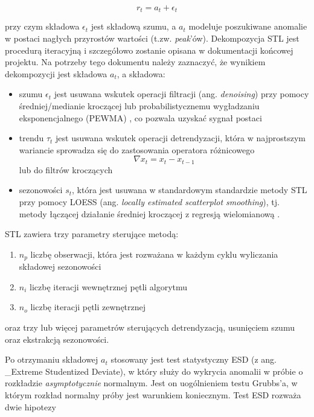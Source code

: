 \documentclass{article}
\begin{document}
\begin{equation*}
  r_{t} = a_{t} + \epsilon_{t}
\end{equation*}



przy czym składowa \(\epsilon_{t}\) jest składową szumu, a \(a_{t}\)
modeluje poszukiwane anomalie w postaci nagłych przyrostów wartości
(t.zw. \emph{peak}'ów). Dekompozycja STL jest procedurą iteracyjną i
szczegółowo zostanie opisana w dokumentacji końcowej projektu. Na
potrzeby tego dokumentu należy zaznaczyć, że wynikiem dekompozycji jest
składowa \(a_{t}\), a składowa:

\begin{itemize}
\item
  szumu \(\epsilon_{t}\) jest usuwana wskutek operacji filtracji (ang.
  \emph{denoising}) przy pomocy średniej/medianie kroczącej lub
  probabilistycznemu wygładzaniu eksponencjalnego (PEWMA) \cite{PEWMA},
  co pozwala uzyskać sygnał postaci
\item
  trendu \(\tau_{t}\) jest usuwana wskutek operacji detrendyzacji, która
  w najprostszym wariancie sprowadza się do zastosowania operatora
  różnicowego \begin{equation*} \nabla x_{t} = x_{t} - x_{t -1} \end{equation*}
    lub do filtrów kroczących
\item
  sezonowości \(s_{t}\), która jest usuwana w standardowym standardzie
  metody STL przy pomocy LOESS (ang. \emph{locally estimated scatterplot
  smoothing}), tj. metody łączącej działanie średniej kroczącej z
  regresją wielomianową \cite{stl-origin}.
\end{itemize}

STL zawiera trzy parametry sterujące metodą:

\begin{enumerate}
\def\labelenumi{\arabic{enumi}.}
\item
  \(n_{p}\) liczbę obserwacji, która jest rozważana w każdym cyklu
  wyliczania składowej sezonowości
\item
  \(n_{i}\) liczbę iteracji wewnętrznej pętli algorytmu
\item
  \(n_{o}\) liczbę iteracji pętli zewnętrznej
\end{enumerate}

oraz trzy lub więcej parametrów sterujących detrendyzacją, usunięciem
szumu oraz ekstrakcją sezonowości.

Po otrzymaniu składowej \(a_{t}\) stosowany jest test statystyczny ESD
(z ang. \_Extreme Studentized Deviate), w który służy do wykrycia
anomalii w próbie o rozkładzie \emph{asymptotycznie} normalnym. Jest on
uogólnieniem testu Grubbs'a, w którym rozkład normalny próby jest
warunkiem koniecznym. Test ESD rozważa dwie hipotezy
\end{document}
